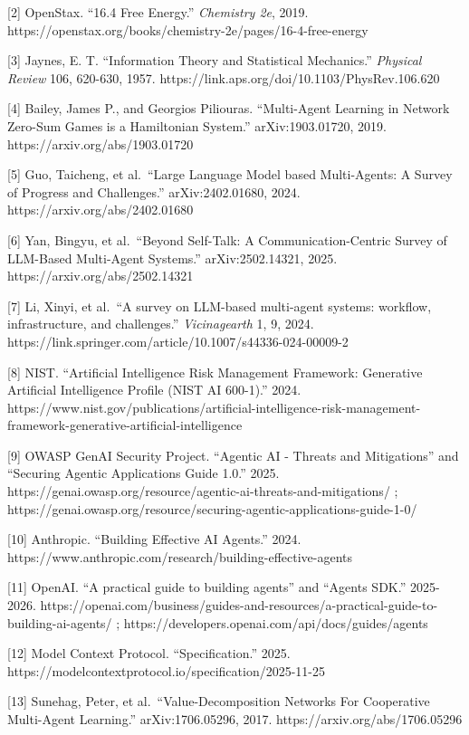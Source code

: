 {[}2{]} OpenStax. ``16.4 Free Energy.'' \emph{Chemistry 2e}, 2019.
https://openstax.org/books/chemistry-2e/pages/16-4-free-energy

{[}3{]} Jaynes, E. T. ``Information Theory and Statistical Mechanics.''
\emph{Physical Review} 106, 620-630, 1957.
https://link.aps.org/doi/10.1103/PhysRev.106.620

{[}4{]} Bailey, James P., and Georgios Piliouras. ``Multi-Agent Learning
in Network Zero-Sum Games is a Hamiltonian System.'' arXiv:1903.01720,
2019. https://arxiv.org/abs/1903.01720

{[}5{]} Guo, Taicheng, et al.~``Large Language Model based Multi-Agents:
A Survey of Progress and Challenges.'' arXiv:2402.01680, 2024.
https://arxiv.org/abs/2402.01680

{[}6{]} Yan, Bingyu, et al.~``Beyond Self-Talk: A Communication-Centric
Survey of LLM-Based Multi-Agent Systems.'' arXiv:2502.14321, 2025.
https://arxiv.org/abs/2502.14321

{[}7{]} Li, Xinyi, et al.~``A survey on LLM-based multi-agent systems:
workflow, infrastructure, and challenges.'' \emph{Vicinagearth} 1, 9,
2024. https://link.springer.com/article/10.1007/s44336-024-00009-2

{[}8{]} NIST. ``Artificial Intelligence Risk Management Framework:
Generative Artificial Intelligence Profile (NIST AI 600-1).'' 2024.
https://www.nist.gov/publications/artificial-intelligence-risk-management-framework-generative-artificial-intelligence

{[}9{]} OWASP GenAI Security Project. ``Agentic AI - Threats and
Mitigations'' and ``Securing Agentic Applications Guide 1.0.'' 2025.
https://genai.owasp.org/resource/agentic-ai-threats-and-mitigations/ ;
https://genai.owasp.org/resource/securing-agentic-applications-guide-1-0/

{[}10{]} Anthropic. ``Building Effective AI Agents.'' 2024.
https://www.anthropic.com/research/building-effective-agents

{[}11{]} OpenAI. ``A practical guide to building agents'' and ``Agents
SDK.'' 2025-2026.
https://openai.com/business/guides-and-resources/a-practical-guide-to-building-ai-agents/
; https://developers.openai.com/api/docs/guides/agents

{[}12{]} Model Context Protocol. ``Specification.'' 2025.
https://modelcontextprotocol.io/specification/2025-11-25

{[}13{]} Sunehag, Peter, et al.~``Value-Decomposition Networks For
Cooperative Multi-Agent Learning.'' arXiv:1706.05296, 2017.
https://arxiv.org/abs/1706.05296

